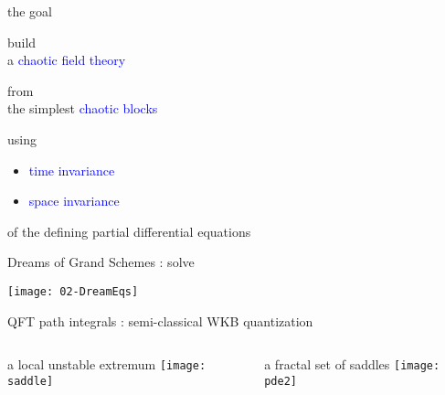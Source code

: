 \begin{frame}{the goal}
\vfill

\begin{center}
{\Large build
\\
a \textcolor{blue}{chaotic field theory}
\medskip

from
\\
the simplest \textcolor{blue}{chaotic blocks}
}
\end{center}

\vfill
using
\begin{itemize}
  \item
\textcolor{blue}{time invariance}
  \item
\textcolor{blue}{space invariance}
\end{itemize}
 of the defining partial differential equations
\end{frame} %

\begin{frame}{Dreams of Grand Schemes : solve}
 \begin{center}
   \texttt{[image: 02-DreamEqs]}
 \end{center}
\end{frame}

\begin{frame}{QFT path integrals : semi-classical WKB quantization}
  \begin{columns}
\begin{block}{a local unstable extremum}
\texttt{[image: saddle]}%
\end{block}
\begin{block}{a fractal set of saddles}
\texttt{[image: pde2]}%
\end{block}
  \end{columns}
\end{frame} %


